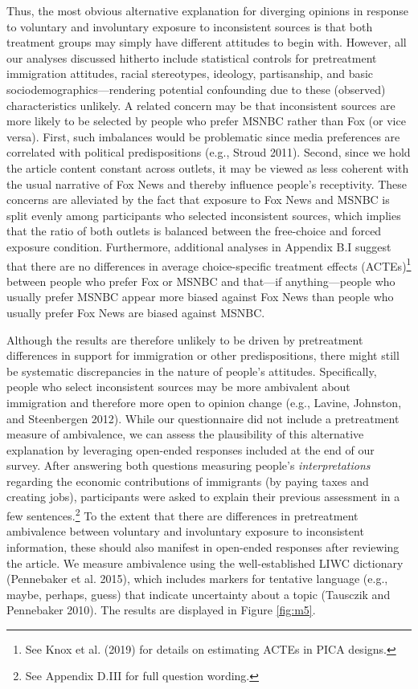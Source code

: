 \documentclass[
  12pt,
]{article}
\begin{document}
Thus, the most obvious alternative explanation for diverging opinions in
response to voluntary and involuntary exposure to inconsistent sources
is that both treatment groups may simply have different attitudes to
begin with. However, all our analyses discussed hitherto include
statistical controls for pretreatment immigration attitudes, racial
stereotypes, ideology, partisanship, and basic
sociodemographics---rendering potential confounding due to these
(observed) characteristics unlikely. A related concern may be that
inconsistent sources are more likely to be selected by people who prefer
MSNBC rather than Fox (or vice versa). First, such imbalances would be
problematic since media preferences are correlated with political
predispositions (e.g., Stroud 2011). Second, since we hold the article
content constant across outlets, it may be viewed as less coherent with
the usual narrative of Fox News and thereby influence people's
receptivity. These concerns are alleviated by the fact that exposure to
Fox News and MSNBC is split evenly among participants who selected
inconsistent sources, which implies that the ratio of both outlets is
balanced between the free-choice and forced exposure condition.
Furthermore, additional analyses in Appendix B.I suggest that there are
no differences in average choice-specific treatment effects
(ACTEs)\footnote{See Knox et al. (2019) for details on estimating ACTEs
  in PICA designs.} between people who prefer Fox or MSNBC and that---if
anything---people who usually prefer MSNBC appear more biased against
Fox News than people who usually prefer Fox News are biased against
MSNBC.

Although the results are therefore unlikely to be driven by pretreatment
differences in support for immigration or other predispositions, there
might still be systematic discrepancies in the nature of people's
attitudes. Specifically, people who select inconsistent sources may be
more ambivalent about immigration and therefore more open to opinion
change (e.g., Lavine, Johnston, and Steenbergen 2012). While our
questionnaire did not include a pretreatment measure of ambivalence, we
can assess the plausibility of this alternative explanation by
leveraging open-ended responses included at the end of our survey. After
answering both questions measuring people's \emph{interpretations}
regarding the economic contributions of immigrants (by paying taxes and
creating jobs), participants were asked to explain their previous
assessment in a few sentences.\footnote{See Appendix D.III for full
  question wording.} To the extent that there are differences in
pretreatment ambivalence between voluntary and involuntary exposure to
inconsistent information, these should also manifest in open-ended
responses after reviewing the article. We measure ambivalence using the
well-established LIWC dictionary (Pennebaker et al. 2015), which
includes markers for tentative language (e.g., maybe, perhaps, guess)
that indicate uncertainty about a topic (Tausczik and Pennebaker 2010).
The results are displayed in Figure \ref{fig:m5}.
\end{document}
